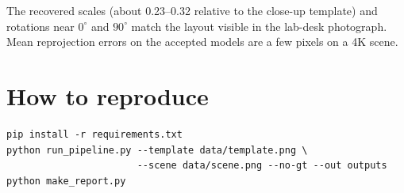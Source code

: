 \documentclass[11pt,a4paper]{article}
\begin{document}
The recovered scales (about 0.23--0.32 relative to the close-up template) and
rotations near $0^\circ$ and $90^\circ$ match the layout visible in the lab-desk
photograph. Mean reprojection errors on the accepted models are a few pixels on
a 4K scene.

\section{How to reproduce}

\begin{verbatim}
pip install -r requirements.txt
python run_pipeline.py --template data/template.png \
                       --scene data/scene.png --no-gt --out outputs
python make_report.py
\end{verbatim}
\end{document}
